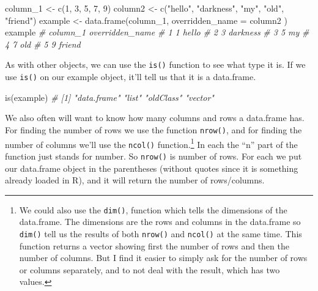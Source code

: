 \documentclass[
  a4paper,
]{krantz}
\makeatletter
\newenvironment{Shaded}{\begin{snugshade}}{\end{snugshade}}
\newcommand{\AttributeTok}[1]{\textcolor[rgb]{0.61,0.61,0.61}{#1}}
\newcommand{\CommentTok}[1]{\textcolor[rgb]{0.37,0.37,0.37}{\textit{#1}}}
\newcommand{\DecValTok}[1]{\textcolor[rgb]{0.06,0.06,0.06}{#1}}
\newcommand{\FunctionTok}[1]{\textcolor[rgb]{0,0,0}{#1}}
\newcommand{\NormalTok}[1]{#1}
\newcommand{\OtherTok}[1]{\textcolor[rgb]{0.37,0.37,0.37}{#1}}
\newcommand{\StringTok}[1]{\textcolor[rgb]{0.5,0.5,0.5}{#1}}
\newenvironment{kframe}{%
\medskip{}
\setlength{\fboxsep}{.8em}
 \def\at@end@of@kframe{}%
 \ifinner\ifhmode%
  \def\at@end@of@kframe{\end{minipage}}%
  \begin{minipage}{\columnwidth}%
 \fi\fi%
 \def\FrameCommand##1{\hskip\@totalleftmargin \hskip-\fboxsep
 \colorbox{shadecolor}{##1}\hskip-\fboxsep
     \hskip-\linewidth \hskip-\@totalleftmargin \hskip\columnwidth}%
 \MakeFramed {\advance\hsize-\width
   \@totalleftmargin\z@ \linewidth\hsize
   \@setminipage}}%
 {\par\unskip\endMakeFramed%
 \at@end@of@kframe}
\renewenvironment{Shaded}{\begin{kframe}}{\end{kframe}}
\makeatother
\begin{document}
\begin{Shaded}
\begin{Highlighting}[]
\NormalTok{column\_1 }\OtherTok{\textless{}{-}} \FunctionTok{c}\NormalTok{(}\DecValTok{1}\NormalTok{, }\DecValTok{3}\NormalTok{, }\DecValTok{5}\NormalTok{, }\DecValTok{7}\NormalTok{, }\DecValTok{9}\NormalTok{)}
\NormalTok{column2 }\OtherTok{\textless{}{-}} \FunctionTok{c}\NormalTok{(}\StringTok{"hello"}\NormalTok{, }\StringTok{"darkness"}\NormalTok{, }\StringTok{"my"}\NormalTok{, }\StringTok{"old"}\NormalTok{, }\StringTok{"friend"}\NormalTok{)}
\NormalTok{example }\OtherTok{\textless{}{-}} \FunctionTok{data.frame}\NormalTok{(column\_1,}
  \AttributeTok{overridden\_name =}\NormalTok{ column2}
\NormalTok{)}
\NormalTok{example}
\CommentTok{\#   column\_1 overridden\_name}
\CommentTok{\# 1        1           hello}
\CommentTok{\# 2        3        darkness}
\CommentTok{\# 3        5              my}
\CommentTok{\# 4        7             old}
\CommentTok{\# 5        9          friend}
\end{Highlighting}
\end{Shaded}

As with other objects, we can use the \texttt{is()} function
to see what type it is. If we use \texttt{is()} on our
example object, it'll tell us that it is a data.frame.

\begin{Shaded}
\begin{Highlighting}[]
\FunctionTok{is}\NormalTok{(example)}
\CommentTok{\# [1] "data.frame" "list"       "oldClass"   "vector"}
\end{Highlighting}
\end{Shaded}

We also often will want to know how many columns and rows a
data.frame has. For finding the number of rows we use the
function \texttt{nrow()}, and for finding the number of
columns we'll use the \texttt{ncol()} function.\footnote{We
  could also use the \texttt{dim()}, function which tells
  the dimensions of the data.frame. The dimensions are the
  rows and columns in the data.frame so \texttt{dim()} tell
  us the results of both \texttt{nrow()} and \texttt{ncol()}
  at the same time. This function returns a vector showing
  first the number of rows and then the number of columns.
  But I find it easier to simply ask for the number of rows
  or columns separately, and to not deal with the result,
  which has two values.} In each the ``n'' part of the
function just stands for number. So \texttt{nrow()} is
number of rows. For each we put our data.frame object in the
parentheses (without quotes since it is something already
loaded in R), and it will return the number of rows/columns.
\end{document}
